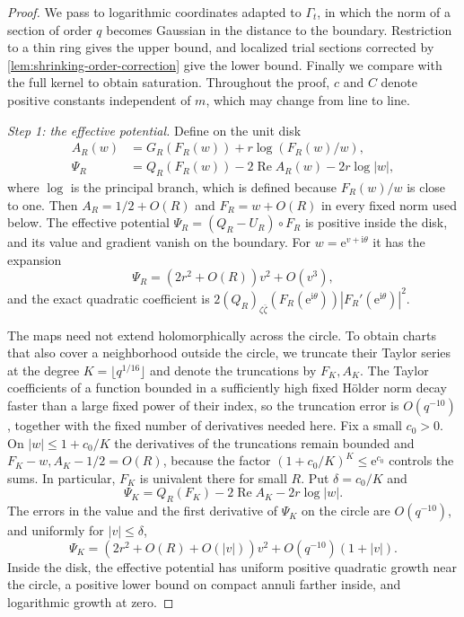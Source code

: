 \begin{proof}
We pass to logarithmic coordinates adapted to $\Gamma_t$, in which the norm of a section of order $q$ becomes Gaussian in the distance to the boundary. Restriction to a thin ring gives the upper bound, and localized trial sections corrected by \cref{lem:shrinking-order-correction} give the lower bound. Finally we compare with the full kernel to obtain saturation. Throughout the proof, $c$ and $C$ denote positive constants independent of $m$, which may change from line to line.

\emph{Step 1: the effective potential.}
Define on the unit disk
\[
 \begin{aligned}
 A_R(w)&=G_R(F_R(w))+r\log(F_R(w)/w),\\
 \Psi_R&=Q_R(F_R(w))-2\operatorname{Re} A_R(w)-2r\log|w|,
 \end{aligned}
\]
where $\log$ is the principal branch, which is defined because $F_R(w)/w$ is close to one. Then $A_R=1/2+O(R)$ and
$F_R=w+O(R)$ in every fixed norm used below. The effective potential $\Psi_R=(Q_R-U_R)\circ F_R$ is positive inside the disk, and its value and gradient vanish on the boundary. For $w=\mathrm{e}^{v+\mathrm{i}\theta}$ it has the expansion
\begin{equation}\label{eq:curvature-ring-expansion}
 \Psi_R=(2r^2+O(R))v^2+O(v^3),
\end{equation}
and the exact quadratic coefficient is
$2(Q_R)_{\zeta\bar\zeta}(F_R(\mathrm{e}^{\mathrm{i}\theta}))|F_R'(\mathrm{e}^{\mathrm{i}\theta})|^2$.

The maps need not extend holomorphically across the circle. To obtain charts that also cover a neighborhood outside the circle, we truncate their Taylor series at the degree $K=\lfloor q^{1/16}\rfloor$ and denote the truncations by $F_K,A_K$. The Taylor coefficients of a function bounded in a sufficiently high fixed H\"older norm decay faster than a large fixed power of their index, so the truncation error is $O(q^{-10})$, together with the fixed number of derivatives needed here. Fix a small $c_0>0$. On $|w|\leq1+c_0/K$ the derivatives of the truncations remain bounded and
$F_K-w,A_K-1/2=O(R)$, because the factor $(1+c_0/K)^K\leq \mathrm{e}^{c_0}$ controls the sums.
In particular, $F_K$ is univalent there for small $R$. Put
$\delta=c_0/K$ and
\[
 \Psi_K=Q_R(F_K)-2\operatorname{Re} A_K-2r\log|w|.
\]
The errors in the value and the first derivative of $\Psi_K$ on the circle are $O(q^{-10})$, and uniformly for $|v|\leq\delta$,
\begin{equation}\label{eq:polynomial-ring-expansion}
 \Psi_K=(2r^2+O(R)+O(|v|))v^2+O(q^{-10})(1+|v|).
\end{equation}
Inside the disk, the effective potential has uniform positive quadratic growth near the circle, a positive lower bound on compact annuli farther inside, and logarithmic growth at zero.


\end{proof}

